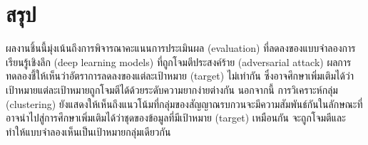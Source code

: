 \documentclass{cpepaper}
\begin{document}
\section{สรุป}

ผลงานชิ้นนี้มุ่งเน้นถึงการพิจารณาคะแนนการประเมินผล (evaluation) ที่ลดลงของแบบจำลองการเรียนรู้เชิงลึก (deep learning models) ที่ถูกโจมตีประสงค์ร้าย (adversarial attack) ผลการทดลองชี้ให้เห็นว่าอัตราการลดลงของแต่ละเป้าหมาย (target) ไม่เท่ากัน ซึ่งอาจศึกษาเพิ่มเติมได้ว่าเป้าหมายแต่ละเป้าหมายถูกโจมตีได้ด้วยระดับความยากง่ายต่างกัน นอกจากนี้ การวิเคราะห์กลุ่ม (clustering) ยังแสดงให้เห็นถึงแนวโน้มที่กลุ่มของสัญญาณรบกวนจะมีความสัมพันธ์กันในลักษณะที่อาจนำไปสู่การศึกษาเพิ่มเติมได้ว่าชุดของข้อมูลที่มีเป้าหมาย (target) เหมือนกัน จะถูกโจมตีและทำให้แบบจำลองเห็นเป็นเป้าหมายกลุ่มเดียวกัน

\renewcommand{\refname}{เอกสารอ้างอิง}
 

\end{document}
